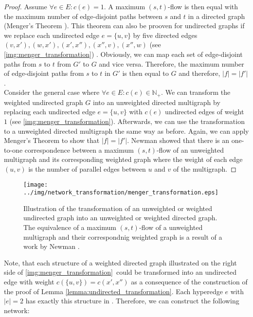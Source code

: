 \begin{proof}
Assume $\forall e \in E: c(e) = 1$. A maximum $(s,t)$-flow is then equal with the maximum
number of edge-disjoint paths between $s$ and $t$ in a directed graph (Menger's Theorem \cite{menger1927allgemeinen}).
This theorem can also be prooven for undirected graphs if we replace each undirected edge
$e = \{u,v\}$ by five directed edges $(v,x'),(w,x'),(x',x''),(x'',v),(x'',w)$ (see \autoref{img:menger_transformation})
\cite{menger1927allgemeinen}. Obviously, we can map each set of edge-disjoint paths from $s$ to $t$ from $G'$ to $G$
and vice versa. Therefore, the maximum number of edge-disjoint paths from $s$ to $t$ in
$G'$ is then equal to $G$ and therefore, $|f| = |f'|$. \\
Consider the general case where $\forall e \in E: c(e) \in \mathbb{N}_+$. We can transform the
weighted undirected graph $G$ into an unweighted directed multigraph by replacing each undirected
edge $e = \{u,v\}$ with $c(e)$ undirected edges of weight $1$ (see \autoref{img:menger_transformation}).
Afterwards, we can use the transformation to a unweighted directed multigraph the same way as before.
Again, we can apply Menger's Theorem to show that $|f| = |f'|$. Newman \cite{newman2004analysis}
showed that there is an one-to-one correspondence between a maximum $(s,t)$-flow of an unweighted multigraph
and its corresponding weighted graph where the weight of each edge $(u,v)$ is the number of parallel
edges between $u$ and $v$ of the multigraph.
\end{proof}

\begin{figure}
\centering
\texttt{[image: ../img/network\_transformation/menger\_transformation.eps]}
\caption{Illustration of the transformation of an unweighted or weighted undirected graph into
         an unweighted or weighted directed graph. The equivalence of a maximum $(s,t)$-flow
         of a unweighted multigraph and their correspondnig weighted graph is a result of 
         a work by Newman \cite{newman2004analysis}.}
\label{img:menger_transformation}
\end{figure}

Note, that each structure of a weighted directed graph illustrated on the right side of
\autoref{img:menger_transformation}~could be transformed into an undirected edge with weight
$c(\{u,v\}) = c(x',x'')$ as a consequence of the construction of the proof of Lemma \ref{lemma:undirected_transformation}.
Each hyperedge $e$ with $|e| = 2$ has exactly this structure in . Therefore, we can 
construct the following network:


